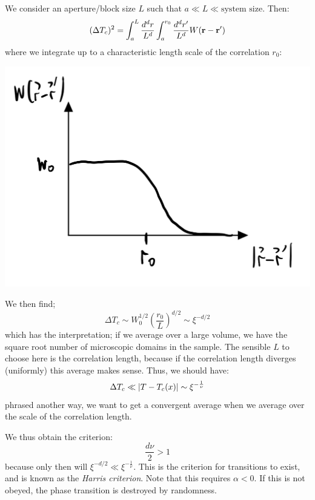 We consider an aperture/block size $L$ such that $a \ll L \ll \text{system size}$. Then:
\begin{equation}
    (\Delta T_c)^2 = \int_a^L \frac{d^dr}{L^d}\int_a^{r_0}\frac{d^dr'}{L^d}W(\mathbf{r} - \mathbf{r}')
\end{equation}
where we integrate up to a characteristic length scale of the correlation $r_0$:

\begin{center}
    \includegraphics[scale=0.4]{Lectures/Figures/lec12-corr.png}
\end{center}

We then find;
\begin{equation}
    \Delta T_c \sim W_0^{1/2}\left(\frac{r_0}{L}\right)^{d/2} \sim \xi^{-d/2}
\end{equation}
which has the interpretation; if we average over a large volume, we have the square root number of microscopic domains in the sample. The sensible $L$ to choose here is the correlation length, because if the correlation length diverges (uniformly) this average makes sense. Thus, we should have:
\begin{equation}
    \Delta T_c \ll \lvert T - T_c(x) \rvert \sim \xi^{-\frac{1}{\nu}}
\end{equation}
phrased another way, we want to get a convergent average when we average over the scale of the correlation length.

We thus obtain the criterion:
\begin{equation}
    \boxed{\frac{d\nu}{2} > 1}
\end{equation}
because only then will $\xi^{-d/2} \ll \xi^{-\frac{1}{\nu}}$. This is the criterion for transitions to exist, and is known as the \emph{Harris criterion}. Note that this requires $\alpha < 0$. If this is not obeyed, the phase transition is destroyed by randomness.

